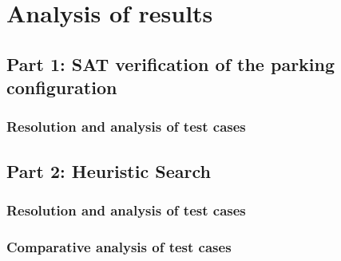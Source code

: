 \chapter{Analysis of results}
\label{chapter: analysis of results}









\section{Part 1: SAT verification of the parking configuration}

\subsection{Resolution and analysis of test cases}

\paragraph{}


\section{Part 2: Heuristic Search}

\subsection{Resolution and analysis of test cases}

\paragraph{}

\subsection{Comparative analysis of test cases}

\paragraph{}
